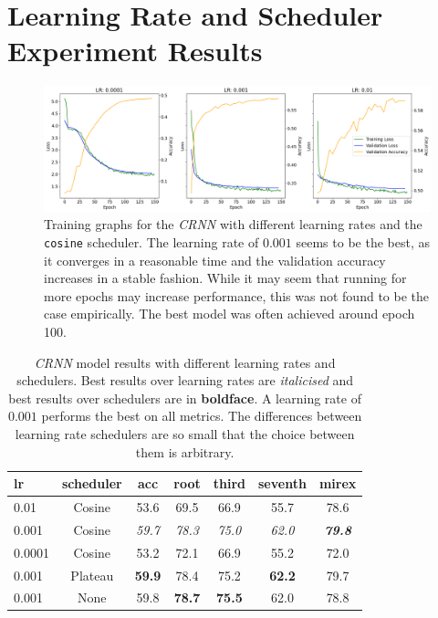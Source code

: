 \section{Learning Rate and Scheduler Experiment Results}\label{app:learning_experiment_results}

\begin{figure}[H]
    \centering
    \includegraphics[width=1.0\textwidth]{figures/lr_search_cosine.png}
    \caption{Training graphs for the \emph{CRNN} with different learning rates and the \texttt{cosine} scheduler. The learning rate of $0.001$ seems to be the best, as it converges in a reasonable time and the validation accuracy increases in a stable fashion. While it may seem that running for more epochs may increase performance, this was not found to be the case empirically. The best model was often achieved around epoch 100.}\label{fig:lr_search_cosine}
\end{figure}

\begin{table}[H]
    \centering
    \begin{tabular}{lcccccc}
        \toprule
        lr & scheduler & acc & root & third & seventh & mirex \\
        \midrule
        0.01 & Cosine &  53.6 & 69.5 & 66.9 & 55.7 & 78.6 \\
        0.001 & Cosine & \emph{59.7} & \emph{78.3} & \emph{75.0} & \emph{62.0} & \emph{\textbf{79.8}} \\
        0.0001 & Cosine & 53.2 & 72.1 & 66.9 & 55.2 & 72.0 \\
        \midrule
        0.001 & Plateau & \textbf{59.9} & 78.4 & 75.2 & \textbf{62.2} & 79.7 \\
        0.001 & None & 59.8 & \textbf{78.7} &\textbf{75.5} & 62.0 & 78.8 \\
        \bottomrule
    \end{tabular}
    \caption{\emph{CRNN} model results with different learning rates and schedulers. Best results over learning rates are \emph{italicised} and best results over schedulers are in \textbf{boldface}. A learning rate of $0.001$ performs the best on all metrics. The differences between learning rate schedulers are so small that the choice between them is arbitrary. }\label{tab:crnn_lr}
\end{table}

